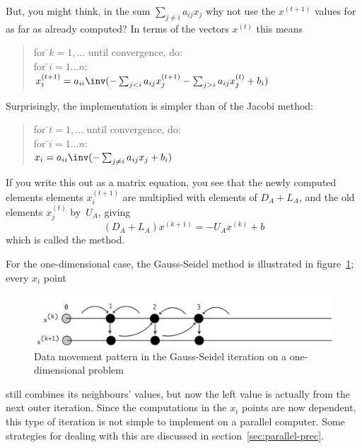But, you might think, in the sum $\sum_{j\not=i} a_{ij}x_j$ why
not use the $x^{(t+1)}$ values for as far as already computed?
In terms of the vectors $x^{(t)}$ this means
\begin{quote}
  \begin{tabbing}
    for \=$k=1,\ldots$ until convergence, do:\\
    \>for \=$i=1\ldots n$:\\
    \>\>$x^{(t+1)}_i = a_{ii}\inv (-\sum_{j<i} a_{ij}x_j^{(t+1)} -
                      \sum_{j>i} a_{ij}x_j^{(t)}+b_i)$\\
  \end{tabbing}
\end{quote}
Surprisingly, the implementation is simpler than of the Jacobi method:
\begin{quote}
  \begin{tabbing}
    for \=$t=1,\ldots$ until convergence, do:\\
    \>for \=$i=1\ldots n$:\\
    \>\>$x_i = a_{ii}\inv (-\sum_{j\not=i} a_{ij}x_j +b_i)$\\
  \end{tabbing}
\end{quote}
If you write this out as a matrix equation, you see that
the newly computed elements elements $x^{(t+1)}_i$ are 
multiplied with elements of $D_A+L_A$,
and the old elements $x^{(t)}_j$ by~$U_A$, giving
\[ (D_A+L_A)x^{(k+1)}=-U_Ax^{(k)}+b \]
which is called the  method.

For the one-dimensional case, the Gauss-Seidel method
is illustrated in figure~\ref{fig:1d-sor}; every $x_i$ point
\begin{figure}[ht]
  \includegraphics[scale=.08]{graphics-public/sor}
  \caption{Data movement pattern in the Gauss-Seidel iteration on a
    one-dimensional problem}
  \label{fig:1d-sor}
\end{figure}
still combines its neighbours' values, but now the left value is
actually from the next outer iteration. Since the computations in the
$x_i$ points are now dependent, this type of iteration is not simple
to implement on a parallel computer. Some strategies for dealing with
this are discussed in section~\ref{sec:parallel-prec}.

